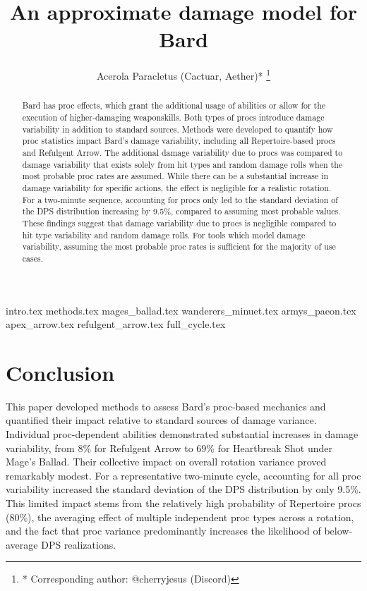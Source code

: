 \documentclass[journal,twocolumn]{IEEEtran}
\begin{document}
\title{An approximate damage model for Bard}
\author{Acerola Paracletus (Cactuar, Aether)*
\thanks{* Corresponding author: @cherryjesus (Discord)}}

\maketitle

\begin{abstract}
Bard has proc effects, which grant the additional usage of abilities or allow for the execution of higher-damaging weaponskills. Both types of procs introduce damage variability in addition to standard sources. Methods were developed to quantify how proc statistics impact Bard's damage variability, including all Repertoire-based procs and Refulgent Arrow. The additional damage variability due to procs was compared to damage variability that exists solely from hit types and random damage rolls when the most probable proc rates are assumed. While there can be a substantial increase in damage variability for specific actions, the effect is negligible for a realistic rotation. For a two-minute sequence, accounting for procs only led to the standard deviation of the DPS distribution increasing by 9.5\%, compared to assuming most probable values. These findings suggest that damage variability due to procs is negligible compared to hit type variability and random damage rolls. For tools which model damage variability, assuming the most probable proc rates is sufficient for the majority of use cases.
\end{abstract}

{intro.tex}
{methods.tex}
{mages_ballad.tex}
{wanderers_minuet.tex}
{armys_paeon.tex}
{apex_arrow.tex}
{refulgent_arrow.tex}
{full_cycle.tex}



\section{Conclusion}

This paper developed methods to assess Bard's proc-based mechanics and quantified their impact relative to standard sources of damage variance. Individual proc-dependent abilities demonstrated substantial increases in damage variability, from 8\% for Refulgent Arrow to 69\% for Heartbreak Shot under Mage's Ballad. Their collective impact on overall rotation variance proved remarkably modest. 
For a representative two-minute cycle, accounting for all proc variability increased the standard deviation of the DPS distribution by only 9.5\%. This limited impact stems from the relatively high probability of Repertoire procs (80\%), the averaging effect of multiple independent proc types across a rotation, and the fact that proc variance predominantly increases the likelihood of below-average DPS realizations.
\end{document}
